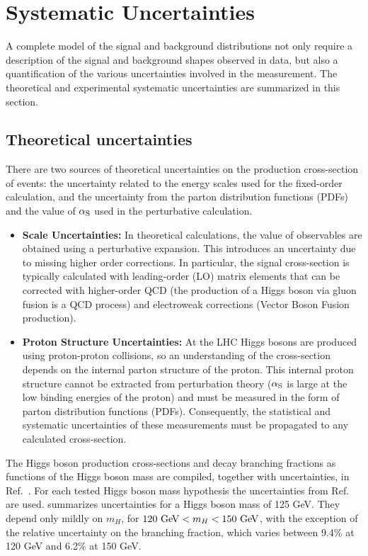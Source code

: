 \section{Systematic Uncertainties}
\label{sec:sys}
A complete model of the signal and background distributions not only require
a description of the signal and background shapes observed in data, but also 
a quantification of the various uncertainties involved in the measurement.
The theoretical and experimental systematic uncertainties are summarized in
this section.

\subsection{Theoretical uncertainties}
There are two sources of theoretical uncertainties on the production cross-section
of \HToZg events: the uncertainty related to the energy scales used for the
fixed-order calculation, and the uncertainty from the parton distribution functions
(PDFs) and the value of $\alpha_{\mathrm{S}}$ used in the perturbative calculation. 

\begin{itemize}
\item \textbf{Scale Uncertainties:} 
In theoretical calculations, the value of observables are obtained using a 
perturbative expansion. This introduces an uncertainty due to missing higher order
corrections. In particular, the \HToZg signal cross-section is typically calculated
with leading-order (LO) matrix elements that can be corrected with higher-order
QCD (the production of a Higgs boson via gluon fusion is a QCD process) and 
electroweak corrections (Vector Boson Fusion production).

\item \textbf{Proton Structure Uncertainties:}
At the LHC Higgs bosons are produced using proton-proton collisions, so
an understanding of the \HToZg cross-section depends on the internal
parton structure of the proton. This internal proton structure cannot be
extracted from perturbation theory ($\alpha_{\mathrm{S}}$ is large at the low binding
energies of the proton) and must be measured in the form of parton distribution
functions (PDFs). Consequently, the statistical and systematic uncertainties 
of these measurements must be propagated to any calculated cross-section.
\end{itemize}

The Higgs boson production
cross-sections and decay branching fractions as functions of the Higgs boson
mass are compiled, together with uncertainties, in Ref.~\cite{LHCHiggsCrossSectionWorkingGroup:2011ti}.
For each tested Higgs boson mass hypothesis the uncertainties from Ref.~\cite{LHCHiggsCrossSectionWorkingGroup:2011ti} are used.
 summarizes uncertainties for a Higgs boson mass of
125 GeV. They depend only mildly on $m_H$, for $120 \GeV < m_H < 150 \GeV$,
with the exception of the relative uncertainty on the \HToZg branching fraction,
which varies between 9.4\% at 120 GeV and 6.2\% at 150 GeV.

